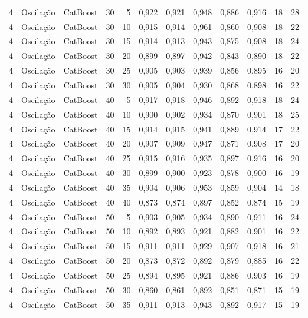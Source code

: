 \begin{longtable}{@{}rllrrrrrrrrr@{}}
4 & Oscilação & CatBoost & 30 & 5 & 0,922 & 0,921 & 0,948 & 0,886 & 0,916 & 18 & 28 \\
4 & Oscilação & CatBoost & 30 & 10 & 0,915 & 0,914 & 0,961 & 0,860 & 0,908 & 18 & 22 \\
4 & Oscilação & CatBoost & 30 & 15 & 0,914 & 0,913 & 0,943 & 0,875 & 0,908 & 18 & 24 \\
4 & Oscilação & CatBoost & 30 & 20 & 0,899 & 0,897 & 0,942 & 0,843 & 0,890 & 18 & 22 \\
4 & Oscilação & CatBoost & 30 & 25 & 0,905 & 0,903 & 0,939 & 0,856 & 0,895 & 16 & 20 \\
4 & Oscilação & CatBoost & 30 & 30 & 0,905 & 0,904 & 0,930 & 0,868 & 0,898 & 16 & 22 \\
4 & Oscilação & CatBoost & 40 & 5 & 0,917 & 0,918 & 0,946 & 0,892 & 0,918 & 18 & 24 \\
4 & Oscilação & CatBoost & 40 & 10 & 0,900 & 0,902 & 0,934 & 0,870 & 0,901 & 18 & 25 \\
4 & Oscilação & CatBoost & 40 & 15 & 0,914 & 0,915 & 0,941 & 0,889 & 0,914 & 17 & 22 \\
4 & Oscilação & CatBoost & 40 & 20 & 0,907 & 0,909 & 0,947 & 0,871 & 0,908 & 17 & 20 \\
4 & Oscilação & CatBoost & 40 & 25 & 0,915 & 0,916 & 0,935 & 0,897 & 0,916 & 16 & 20 \\
4 & Oscilação & CatBoost & 40 & 30 & 0,899 & 0,900 & 0,923 & 0,878 & 0,900 & 16 & 19 \\
4 & Oscilação & CatBoost & 40 & 35 & 0,904 & 0,906 & 0,953 & 0,859 & 0,904 & 14 & 18 \\
4 & Oscilação & CatBoost & 40 & 40 & 0,873 & 0,874 & 0,897 & 0,852 & 0,874 & 15 & 19 \\
4 & Oscilação & CatBoost & 50 & 5 & 0,903 & 0,905 & 0,934 & 0,890 & 0,911 & 16 & 24 \\
4 & Oscilação & CatBoost & 50 & 10 & 0,892 & 0,893 & 0,921 & 0,882 & 0,901 & 16 & 22 \\
4 & Oscilação & CatBoost & 50 & 15 & 0,911 & 0,911 & 0,929 & 0,907 & 0,918 & 16 & 21 \\
4 & Oscilação & CatBoost & 50 & 20 & 0,873 & 0,872 & 0,892 & 0,879 & 0,885 & 16 & 22 \\
4 & Oscilação & CatBoost & 50 & 25 & 0,894 & 0,895 & 0,921 & 0,886 & 0,903 & 16 & 19 \\
4 & Oscilação & CatBoost & 50 & 30 & 0,860 & 0,861 & 0,892 & 0,851 & 0,871 & 15 & 19 \\
4 & Oscilação & CatBoost & 50 & 35 & 0,911 & 0,913 & 0,943 & 0,892 & 0,917 & 15 & 19 \\

\end{longtable}
